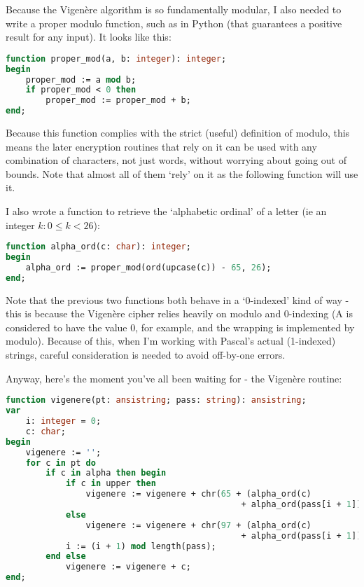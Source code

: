 \documentclass[fleqn,a4paper,11pt]{article}
\begin{document}
    Because the Vigen\`ere algorithm is so fundamentally modular, I also needed
    to write a proper modulo function, such as in Python (that guarantees a
    positive result for any input). It looks like this:

\begin{lstlisting}[language=Pascal, caption=Proper modulo function]
function proper_mod(a, b: integer): integer;
begin
    proper_mod := a mod b;
    if proper_mod < 0 then
        proper_mod := proper_mod + b;
end;
\end{lstlisting}

    Because this function complies with the strict (useful) definition of
    modulo, this means the later encryption routines that rely on it can be
    used with any combination of characters, not just words, without worrying
    about going out of bounds. Note that almost all of them `rely' on it as the
    following function will use it.

    I also wrote a function to retrieve the `alphabetic ordinal' of a letter
    (ie an integer \(k: 0 \leq k < 26\)):

\begin{lstlisting}[language=Pascal, caption=Proper modulo function]
function alpha_ord(c: char): integer;
begin
    alpha_ord := proper_mod(ord(upcase(c)) - 65, 26);
end;
\end{lstlisting}

    Note that the previous two functions both behave in a `0-indexed' kind of
    way - this is because the Vigen\`ere cipher relies heavily on modulo and
    0-indexing (A is considered to have the value 0, for example, and the
    wrapping is implemented by modulo). Because of this, when I'm working with
    Pascal's actual (1-indexed) strings, careful consideration is needed to
    avoid off-by-one errors.

    Anyway, here's the moment you've all been waiting for - the Vigen\`ere
    routine:

\begin{lstlisting}[language=Pascal, label={lst:overflowbug}, caption=Vigen\`ere algorithm]
function vigenere(pt: ansistring; pass: string): ansistring;
var
    i: integer = 0;
    c: char;
begin
    vigenere := '';
    for c in pt do
        if c in alpha then begin
            if c in upper then
                vigenere := vigenere + chr(65 + (alpha_ord(c)
                                               + alpha_ord(pass[i + 1])) mod 26)
            else
                vigenere := vigenere + chr(97 + (alpha_ord(c)
                                               + alpha_ord(pass[i + 1])) mod 26);
            i := (i + 1) mod length(pass);
        end else
            vigenere := vigenere + c;
end;
\end{lstlisting}
\end{document}
